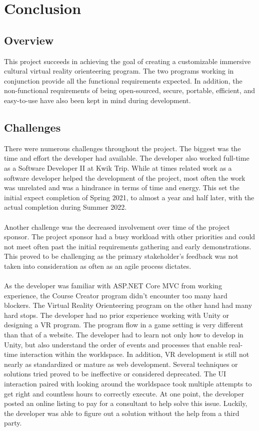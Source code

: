 \section{Conclusion}																	
\label{sec:Conclusion}

\subsection{Overview} 
This project succeeds in achieving the goal of creating a customizable immersive cultural virtual reality orienteering program. The two programs working in conjunction provide all the functional requirements expected. In addition, the non-functional requirements of being open-sourced, secure, portable, efficient, and easy-to-use have also been kept in mind during development.

\subsection{Challenges}
There were numerous challenges throughout the project. The biggest was the time and effort the developer had available. The developer also worked full-time as a Software Developer II at Kwik Trip. While at times related work as a software developer helped the development of the project, most often the work was unrelated and was a hindrance in terms of time and energy. This set the initial expect completion of Spring 2021, to almost a year and half later, with the actual completion during Summer 2022. \\
\\
Another challenge was the decreased involvement over time of the project sponsor. The project sponsor had a busy workload with other priorities and could not meet often past the initial requirements gathering and early demonstrations. This proved to be challenging as the primary stakeholder's feedback was not taken into consideration as often as an agile process dictates.\\
\\ 
As the developer was familiar with ASP.NET Core MVC from working experience, the Course Creator program didn't encounter too many hard blockers. The Virtual Reality Orienteering program on the other hand had many hard stops. The developer had no prior experience working with Unity or designing a VR program. The program flow in a game setting is very different than that of a website. The developer had to learn not only how to develop in Unity, but also understand the order of events and processes that enable real-time interaction within the worldspace. In addition, VR development is still not nearly as standardized or mature as web development. Several techniques or solutions tried proved to be ineffective or considered deprecated.   The UI interaction paired with looking around the worldspace took multiple attempts to get right and countless hours to correctly execute. At one point, the developer posted an online listing to pay for a consultant to help solve this issue. Luckily, the developer was able to figure out a solution without the help from a third party. 

